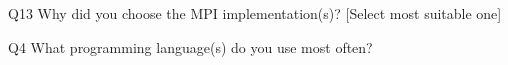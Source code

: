 \begin{description}%
\item{Q13} Why did you choose the MPI implementation(s)? [Select most suitable one]%
\item{Q4} What programming language(s) do you use most often?%
\end{description}%
